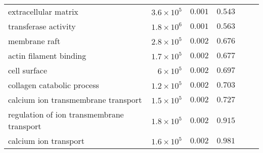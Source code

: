 \begin{longtable}{|l|r|r|r|r|r|}
                      extracellular matrix & $3.6\times 10^{5}$ &             $ 0.001$ &                     $ 0.543~~$ \\
                      transferase activity & $1.8\times 10^{6}$ &             $ 0.001$ &                     $ 0.563~~$ \\
                             membrane raft & $2.8\times 10^{5}$ &             $ 0.002$ &                     $ 0.676~~$ \\
                    actin filament binding & $1.7\times 10^{5}$ &             $ 0.002$ &                     $ 0.677~~$ \\
                              cell surface &  $ 6\times 10^{5}$ &             $ 0.002$ &                     $ 0.697~~$ \\
                collagen catabolic process & $1.2\times 10^{5}$ &             $ 0.002$ &                     $ 0.703~~$ \\
       calcium ion transmembrane transport & $1.5\times 10^{5}$ &             $ 0.002$ &                     $ 0.727~~$ \\
 regulation of ion transmembrane transport & $1.8\times 10^{5}$ &             $ 0.002$ &                     $ 0.915~~$ \\
                     calcium ion transport & $1.6\times 10^{5}$ &             $ 0.002$ &                     $ 0.981~~$ \\
\end{longtable}

